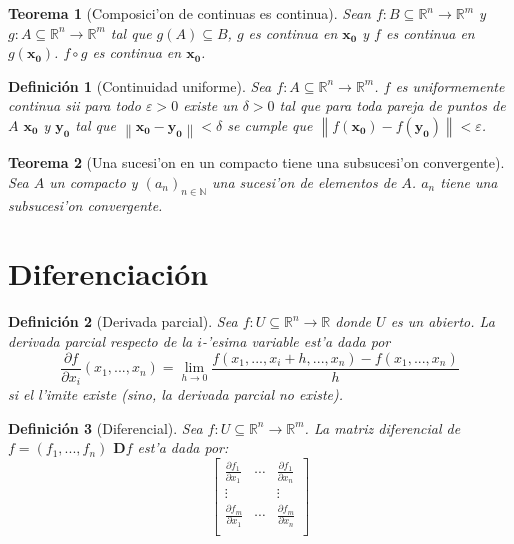 \documentclass[a4paper,spanish]{article}
\newcommand{\R}[0]{\mathbb{R}}
\newcommand{\N}[0]{\mathbb{N}}
\newcommand{\norma}[1]{\left\|#1\right\|}
\newcommand{\limite}[2]{\lim_{ #1 \rightarrow #2}}
\newcommand{\xO}[0]{\mathbf{x_0}}
\newcommand{\yO}[0]{\mathbf{y_0}}
\newcommand{\comp}[0]{\circ}
\newcommand{\parcial}[2]{\frac{\partial #1}{\partial #2}}
\newcommand{\D}[0]{\mathbf{D}}
\newcommand{\eps}[0]{\varepsilon}
\newtheorem{teo}{Teorema}
\newtheorem{defi}{Definici\'on}
\begin{document}
\begin{teo}[Composici'on de continuas es continua]
\label{teo-composicion-continua}
Sean $f : B \subseteq \R^n \to \R^m$ y $g : A \subseteq \R^n \to \R^m$ tal
que $g(A) \subseteq B$, $g$ es continua en $\xO$ y $f$ es continua en $g(\xO)$.
$f \comp g$ es continua en $\xO$.
\end{teo}

\begin{defi}[Continuidad uniforme]
\label{def-continua}
Sea $f : A \subseteq \R^n \to \R^m$. $f$ es \emph{uniformemente continua} sii
para todo $\eps > 0$ existe un $\delta > 0$ tal que para toda pareja de puntos
de $A$ $\xO$ y $\yO$ tal que $\norma{\xO-\yO} < \delta$ se cumple que
$\norma{f(\xO) - f(\yO)} < \eps$.
\end{defi}

\begin{teo}[Una sucesi'on en un compacto tiene una subsucesi'on convergente]
\label{teo-subsuc-convergente}
Sea $A$ un compacto y $(a_n)_{n \in \N}$ una sucesi'on de elementos de $A$.
$a_n$ tiene una subsucesi'on convergente.
\end{teo}

\section{Diferenciaci\'on}

\begin{defi}[Derivada parcial]
\label{def-derivada-parcial}
Sea $f : U \subseteq \R^n \to \R$ donde $U$ es un abierto. La \emph{derivada
parcial} respecto de la $i$-'esima variable est'a dada por
$$\parcial{f}{x_i} (x_1,...,x_n) = \limite{h}{0} 
	\frac{f(x_1,...,x_i+h,...,x_n) - f(x_1,...,x_n)}{h}$$
si el l'imite existe (sino, la derivada parcial no existe).
\end{defi}

\begin{defi}[Diferencial]
\label{def-matriz-diferencial}
Sea $f : U \subseteq \R^n \to \R^m$. La \emph{matriz diferencial} de
$f = (f_1,...,f_n)$ $\D f$ est'a dada por:
$$\left[
\begin{array}{ccc}
\parcial{f_1}{x_1} & \cdots & \parcial{f_1}{x_n} \\
\vdots &  & \vdots \\
\parcial{f_m}{x_1} & \cdots & \parcial{f_m}{x_n} \\
\end{array}
\right]$$
\end{defi}
\end{document}
